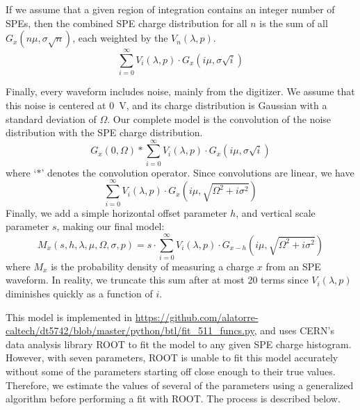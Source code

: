 \documentclass[12pt,openright,twoside]{report}
\begin{document}
If we assume that a given region of integration contains an integer number of
SPEs, then the combined SPE charge distribution for all $n$ is the sum of all
$G_x(n\mu, \sigma\sqrt{n})$, each weighted by the $V_n(\lambda, p)$.
\begin{equation}
    \sum_{i=0}^\infty V_i(\lambda, p) \cdot G_x(i\mu, \sigma\sqrt{i}) 
\end{equation}

Finally, every waveform includes noise, mainly from the digitizer. We assume
that this noise is centered at \SI{0}{V}, and its charge distribution is
Gaussian with a standard deviation of $\Omega$. Our complete model is the
convolution of the noise distribution with the SPE charge distribution.
\begin{equation}
G_x(0, \Omega) * \sum_{i=0}^\infty V_i(\lambda, p) \cdot G_x(i\mu, \sigma\sqrt{i})
\end{equation}
where `$*$' denotes the convolution operator. Since convolutions are linear, we
have
\begin{equation}
\sum_{i=0}^\infty V_i(\lambda, p) \cdot G_x(i\mu, \sqrt{\Omega^2 + i\sigma^2})
\end{equation}
Finally, we add a simple horizontal offset parameter $h$, and vertical scale
parameter $s$, making our final model:
\begin{equation}
M_x(s, h, \lambda, \mu, \Omega, \sigma, p) = s \cdot \sum_{i=0}^\infty V_i(\lambda, p) \cdot G_{x-h}(i\mu, \sqrt{\Omega^2 + i\sigma^2})
\end{equation}
where $M_x$ is the probability density of measuring a charge $x$ from an SPE
waveform. In reality, we truncate this sum after at most 20 terms since
$V_i(\lambda, p)$ diminishes quickly as a function of $i$. 

This model is implemented in
\url{https://github.com/alatorre-caltech/dt5742/blob/master/python/btl/fit_511_funcs.py},
and uses CERN's data analysis library ROOT to fit the model to any given SPE
charge histogram. However, with seven parameters, ROOT is unable to fit this
model accurately without some of the parameters starting off close enough to
their true values. Therefore, we estimate the values of several of the
parameters using a generalized algorithm before performing a fit with ROOT. The
process is described below.
\end{document}
